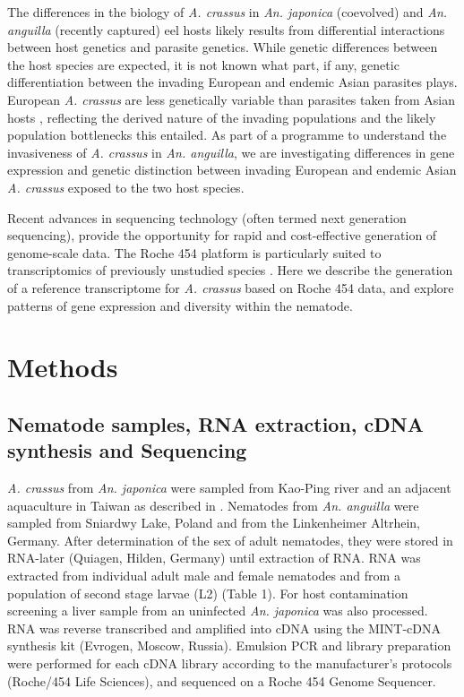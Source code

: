 \documentclass[10pt]{bmc_article}
\newenvironment{bmcformat}{\begin{raggedright}\baselineskip20pt\sloppy\setboolean{publ}{false}}{\end{raggedright}\baselineskip20pt\sloppy}
\begin{document}
\begin{bmcformat}
The differences in the biology of \textit{A. crassus} in
\textit{An. japonica} (coevolved) and \textit{An. anguilla} (recently
captured) eel hosts likely results from differential interactions
between host genetics and parasite genetics. While genetic differences
between the host species are expected, it is not known what part, if
any, genetic differentiation between the invading European and endemic
Asian parasites plays.  European \textit{A. crassus} are less
genetically variable than parasites taken from Asian hosts
\cite{wielgoss_population_2008}, reflecting the derived nature of the
invading populations and the likely population bottlenecks this
entailed. As part of a programme to understand the invasiveness of
\textit{A. crassus} in \textit{An. anguilla}, we are investigating
differences in gene expression and genetic distinction between
invading European and endemic Asian \textit{A. crassus} exposed to the
two host species.

Recent advances in sequencing technology (often termed next generation
sequencing), provide the opportunity for rapid and cost-effective
generation of genome-scale data. The Roche 454 platform
\cite{pmid16056220} is particularly suited to transcriptomics of
previously unstudied species \cite{pmid20950480}. Here we describe the
generation of a reference transcriptome for \textit{A. crassus} based
on Roche 454 data, and explore patterns of gene expression and
diversity within the nematode.

\section*{Methods}


\subsection*{Nematode samples, RNA extraction, cDNA synthesis and Sequencing}

\textit{A. crassus} from \textit{An. japonica} were sampled from
Kao-Ping river and an adjacent aquaculture in Taiwan as described in
\cite{heitlinger_massive_2009}. Nematodes from \textit{An. anguilla}
were sampled from Sniardwy Lake, Poland and from the Linkenheimer
Altrhein, Germany. After determination of the sex of adult nematodes,
they were stored in RNA-later (Quiagen, Hilden, Germany) until
extraction of RNA. RNA was extracted from individual adult male and
female nematodes and from a population of second stage larvae (L2)
(Table 1). For host contamination screening a liver sample from an
uninfected \textit{An. japonica} was also processed. RNA was reverse
transcribed and amplified into cDNA using the MINT-cDNA synthesis kit
(Evrogen, Moscow, Russia). Emulsion PCR and library preparation were
performed for each cDNA library according to the manufacturer's
protocols (Roche/454 Life Sciences), and sequenced on a Roche 454
Genome Sequencer.


\end{bmcformat}
\end{document}
